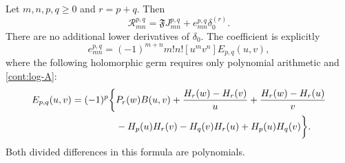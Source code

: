 \begin{theorem}
\label{cont:main}
Let $m,n,p,q\ge0$ and $r=p+q$.  Then
\begin{equation}\label{cont:main-identity}
 \boxed{\mathcal R_{mn}^{p,q}
      =\mathfrak F J_{mn}^{p,q}+e_{mn}^{p,q}\delta_0^{(r)}}.
\end{equation}
There are no additional lower derivatives of $\delta_0$.
The coefficient is explicitly
\begin{equation}\label{cont:coefficient}
 e_{mn}^{p,q}=(-1)^{m+n}m!n![u^mv^n]E_{p,q}(u,v),
\end{equation}
where the following holomorphic germ requires only polynomial
arithmetic and \eqref{cont:log-A}:
\begin{align}
 E_{p,q}(u,v)=(-1)^p\bigg\{
 &P_r(w)B(u,v)
   +\frac{H_r(w)-H_r(v)}{u}
   +\frac{H_r(w)-H_r(u)}{v}\notag\\
 &-H_p(u)H_r(v)-H_q(v)H_r(u)+H_p(u)H_q(v)\bigg\}.
 \label{cont:E}
\end{align}
Both divided differences in this formula are polynomials.
\end{theorem}

